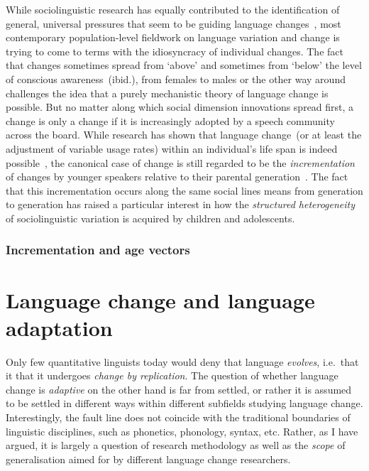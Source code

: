 While sociolinguistic research has equally contributed to the identification of general, universal pressures that seem to be guiding language changes~\citep[see][for an extensive summary in relation to sound changes in particular]{Labov1994}, most contemporary population-level fieldwork on language variation and change is trying to come to terms with the idiosyncracy of individual changes. The fact that changes sometimes spread from `above' and sometimes from `below' the level of conscious awareness~(ibid.), from females to males or the other way around~\citep{Milroy1985,Eckert1989,Labov2001} challenges the idea that a purely mechanistic theory of language change is possible.
But no matter along which social dimension innovations spread first, a change is only a change if it is increasingly adopted by a speech community across the board. While research has shown that %
language change~(or at least the adjustment of variable usage rates) within an individual's life span is indeed possible~\citep{Sankoff2007,Buchstaller2015}, the canonical case of change is still regarded to be the \emph{incrementation} of changes by younger speakers relative to their parental generation~\citep{Labov2001,Tagliamonte2009}. The fact that this incrementation occurs along the same social lines means from generation to generation has raised a particular interest in how the \emph{structured heterogeneity} of sociolinguistic variation is acquired by children and adolescents.

\subsubsection{Incrementation and age vectors}
\label{sec:agevector}


\section{Language change and language adaptation}\label{sec:adaptationism}

Only few quantitative linguists today would deny that language \emph{evolves}, i.e.~that it that it undergoes \emph{change by replication}. The question of whether language change is \emph{adaptive} on the other hand is far from settled, or rather it is assumed to be settled in different ways within different subfields studying language change. Interestingly, the fault line does not coincide with the traditional boundaries of linguistic disciplines, such as phonetics, phonology, syntax, etc. Rather, as I have argued, it is largely a question of research methodology as well as the \emph{scope} of generalisation aimed for by different language change researchers.

